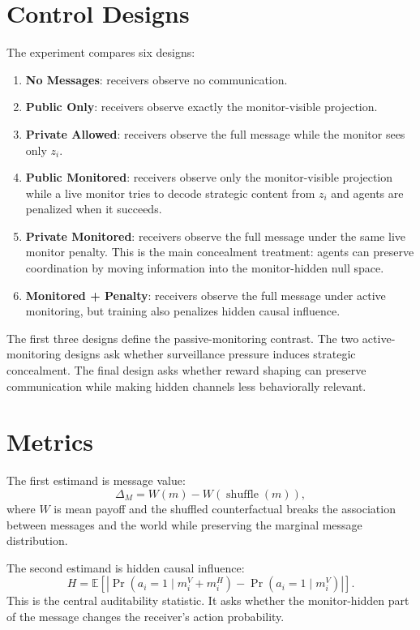 \documentclass[11pt]{article}
\begin{document}
\section{Control Designs}

The experiment compares six designs:
\begin{enumerate}
    \item \textbf{No Messages}: receivers observe no communication.
    \item \textbf{Public Only}: receivers observe exactly the monitor-visible projection.
    \item \textbf{Private Allowed}: receivers observe the full message while the monitor sees only $z_i$.
    \item \textbf{Public Monitored}: receivers observe only the monitor-visible projection while a live monitor tries to decode strategic content from $z_i$ and agents are penalized when it succeeds.
    \item \textbf{Private Monitored}: receivers observe the full message under the same live monitor penalty. This is the main concealment treatment: agents can preserve coordination by moving information into the monitor-hidden null space.
    \item \textbf{Monitored + Penalty}: receivers observe the full message under active monitoring, but training also penalizes hidden causal influence.
\end{enumerate}

The first three designs define the passive-monitoring contrast. The two active-monitoring designs ask whether surveillance pressure induces strategic concealment. The final design asks whether reward shaping can preserve communication while making hidden channels less behaviorally relevant.

\section{Metrics}

The first estimand is message value:
\[
    \Delta_M = W(m) - W(\operatorname{shuffle}(m)),
\]
where $W$ is mean payoff and the shuffled counterfactual breaks the association between messages and the world while preserving the marginal message distribution.

The second estimand is hidden causal influence:
\[
    H = \mathbb{E}\left[ \left| \Pr(a_i=1\mid m_i^V+m_i^H) - \Pr(a_i=1\mid m_i^V) \right| \right].
\]
This is the central auditability statistic. It asks whether the monitor-hidden part of the message changes the receiver's action probability.
\end{document}
